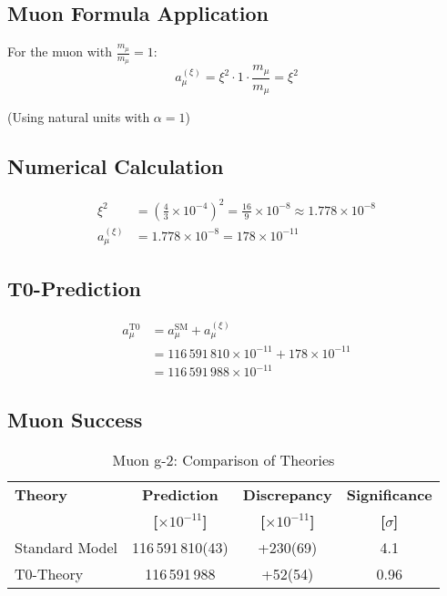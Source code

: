 \documentclass[12pt,a4paper]{article}
\newcommand{\xipar}{\xi}
\begin{document}
	\subsection{Muon Formula Application}
	
	For the muon with \(\frac{m_\mu}{m_\mu} = 1\):
	\begin{equation}
		a_\mu^{(\xipar)} = \xipar^2 \cdot 1 \cdot \frac{m_\mu}{m_\mu} = \xipar^2
	\end{equation}
	
	(Using natural units with \(\alpha = 1\))
	
	\subsection{Numerical Calculation}
	
	\begin{align}
		\xipar^2 &= \left(\frac{4}{3} \times 10^{-4}\right)^2 = \frac{16}{9} \times 10^{-8} \approx 1.778 \times 10^{-8} \\
		a_\mu^{(\xipar)} &= 1.778 \times 10^{-8} = 178 \times 10^{-11}
	\end{align}
	
	\subsection{T0-Prediction}
	
	\begin{align}
		a_\mu^{\text{T0}} &= a_\mu^{\text{SM}} + a_\mu^{(\xipar)} \\
		&= 116\,591\,810 \times 10^{-11} + 178 \times 10^{-11} \\
		&= 116\,591\,988 \times 10^{-11}
	\end{align}
	
	\subsection{Muon Success}
	
	\begin{table}[H]
		\centering
		\caption{Muon g-2: Comparison of Theories}
		\begin{tabular}{@{}lccc@{}}
			\toprule
			\textbf{Theory} & \textbf{Prediction} & \textbf{Discrepancy} & \textbf{Significance} \\
			& \textbf{[$\times 10^{-11}$]} & \textbf{[$\times 10^{-11}$]} & \textbf{[$\sigma$]} \\
			\midrule
			Standard Model & 116\,591\,810(43) & +230(69) & 4.1 \\
			\rowcolor{green!20}
			T0-Theory & 116\,591\,988 & +52(54) & 0.96 \\
			\bottomrule
		\end{tabular}
	\end{table}
	
\end{document}
